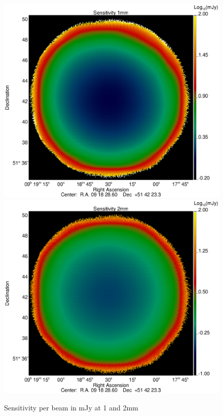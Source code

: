 
\begin{figure}[htbp]
\begin{center}
\includegraphics[clip, angle=0, scale = 0.30]{Figures/hls_sensit_1mm_log.eps}
\includegraphics[clip, angle=0, scale = 0.30]{Figures/hls_sensit_2mm_log.eps}
\caption{Sensitivity per beam in mJy at 1 and 2mm}
\label{fig:hls_cov}
\end{center}
\end{figure}


